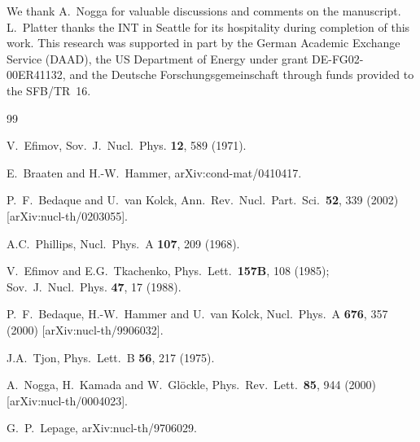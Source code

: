 \documentclass[prc,preprint,tightenlines,showpacs]{revtex4}
\begin{document}
\begin{acknowledgments}
We thank A.~Nogga for valuable discussions and comments on the manuscript.
L.~Platter thanks the INT in Seattle for its hospitality during
completion of this work. This research was supported in part by the 
German Academic Exchange Service (DAAD), the US Department of
Energy under grant DE-FG02-00ER41132, and the Deutsche Forschungsgemeinschaft
through funds provided to the SFB/TR~16.
\end{acknowledgments}
%
\begin{thebibliography}{99}

V.~Efimov,
Sov.\ J.\ Nucl.\ Phys. {\bf 12}, 589 (1971).

E.~Braaten and H.-W.~Hammer,
arXiv:cond-mat/0410417.


P.~F.~Bedaque and U.~van Kolck,
Ann.\ Rev.\ Nucl.\ Part.\ Sci.\  {\bf 52}, 339 (2002)
[arXiv:nucl-th/0203055].


A.C.~Phillips, 
 Nucl.\ Phys.\ A {\bf 107}, 209 (1968).

V.\ Efimov and E.G.\ Tkachenko,
Phys.\ Lett.\ {\bf 157B}, 108 (1985);
Sov.\ J.\ Nucl.\ Phys. {\bf 47}, 17 (1988).

P.~F.~Bedaque, H.-W.~Hammer and U.~van Kolck,
Nucl.\ Phys.\ A {\bf 676}, 357 (2000)
[arXiv:nucl-th/9906032].

J.A.~Tjon, 
Phys.\ Lett.\ B {\bf 56}, 217 (1975).

A.~Nogga, H.~Kamada and W.~Gl{\"o}ckle,
Phys.\ Rev.\ Lett.\  {\bf 85}, 944 (2000)
[arXiv:nucl-th/0004023].

G.~P.~Lepage,
arXiv:nucl-th/9706029.


\end{thebibliography}
\end{document}
